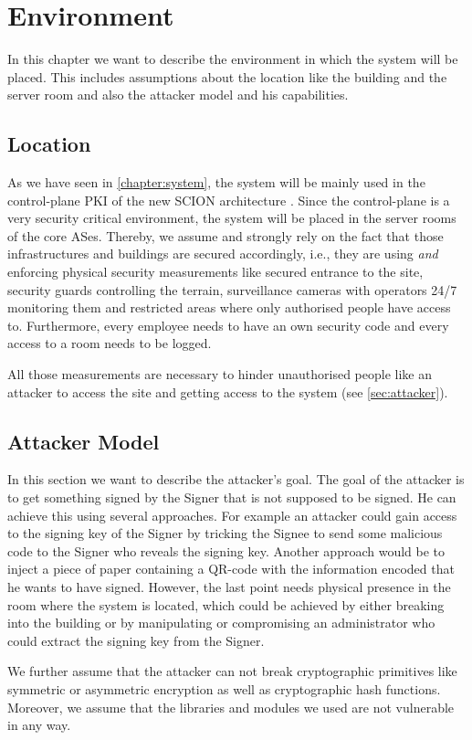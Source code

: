 \chapter{Environment}\label{chapter:environment}
In this chapter we want to describe the environment in which the system will be placed. This includes assumptions about the location like the building and the server room and also the attacker model and his capabilities.

\section{Location}\label{sec:location}
As we have seen in \autoref{chapter:system}, the system will be mainly used in the control-plane PKI of the new SCION architecture \cite{scion_book}. Since the control-plane is a very security critical environment, the system will be placed in the server rooms of the core ASes. Thereby, we assume and strongly rely on the fact that those infrastructures and buildings are secured accordingly, i.e., they are using \emph{and} enforcing physical security measurements like secured entrance to the site, security guards controlling the terrain, surveillance cameras with operators 24/7 monitoring them and restricted areas where only authorised people have access to. Furthermore, every employee needs to have an own security code and every access to a room needs to be logged.

All those measurements are necessary to hinder unauthorised people like an attacker to access the site and getting access to the system (see \autoref{sec:attacker}).

\section{Attacker Model}\label{sec:attacker}
In this section we want to describe the attacker's goal. The goal of the attacker is to get something signed by the Signer that is not supposed to be signed. %
He can achieve this using several approaches. For example an attacker could gain access to the signing key of the Signer by tricking the Signee to send some malicious code to the Signer who reveals the signing key. Another approach would be to inject a piece of paper containing a QR-code with the information encoded that he wants to have signed. However, the last point needs physical presence in the room where the system is located, which could be achieved by either breaking into the building or by manipulating or compromising an administrator who could extract the signing key from the Signer.

We further assume that the attacker can not break cryptographic primitives like symmetric or asymmetric encryption as well as cryptographic hash functions. Moreover, we assume that the libraries and modules we used \cite{tweetnacl, jqueryqrcode, instascan} are not vulnerable in any way.